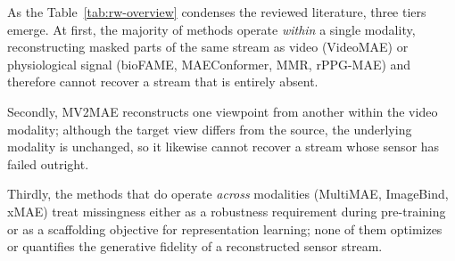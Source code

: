 As the Table~\ref{tab:rw-overview} condenses the reviewed literature, three tiers emerge.
At first, the majority of methods operate \emph{within} a single modality, reconstructing
masked parts of the same stream as video (VideoMAE) or physiological signal
(bioFAME, MAEConformer, MMR, rPPG-MAE) and therefore cannot recover a stream
that is entirely absent. 

Secondly, MV2MAE reconstructs one viewpoint from another
within the video modality; although the target view differs from the source, the
underlying modality is unchanged, so it likewise cannot recover a stream whose
sensor has failed outright. 

Thirdly, the methods that do operate \emph{across} modalities (MultiMAE, ImageBind, xMAE) treat missingness either as a robustness
requirement during pre-training or as a scaffolding objective for representation
learning; none of them optimizes or quantifies the generative fidelity of a
reconstructed sensor stream.

